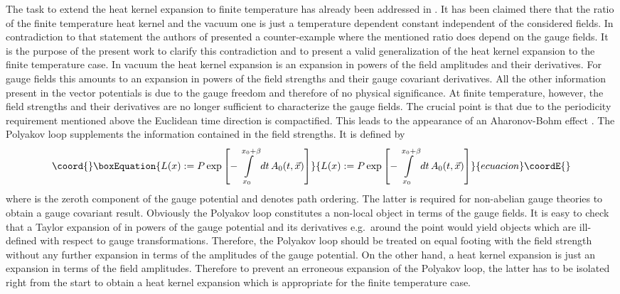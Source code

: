 \documentclass[a4paper,showpacs,showkeys,prd,nofootinbib]{revtex4}
\begin{document}
The task to extend the heat kernel expansion to finite temperature has
already been addressed in \cite{Boschi-Filho:1992ah}. It has been claimed there that the ratio
of the finite temperature heat kernel and the vacuum one is just a temperature
dependent constant independent of the considered fields. In contradiction to that
statement the authors of \cite{Actor:1998cn} presented a counter-example where the mentioned
ratio does depend on the gauge fields.
It is the purpose of the present work to clarify this contradiction and to present
a valid generalization of the heat kernel expansion to the finite temperature case.
In vacuum the heat kernel expansion is an expansion in powers of the field
amplitudes and their derivatives. For gauge fields this amounts to an expansion
in powers of the field strengths and their gauge covariant derivatives. All the
other information present in the vector potentials is due to the gauge freedom and
therefore of no physical significance. 
At finite temperature, however, the field strengths and their derivatives are no longer 
sufficient to characterize the gauge fields. The crucial point is that due to the
periodicity requirement mentioned above the Euclidean time direction is compactified.
This leads to the appearance of an Aharonov-Bohm effect \cite{Aharonov:1959fk}. 
The Polyakov loop 
\cite{Polyakov:1978vu} supplements the information contained in the field strengths. 
It is defined by
\begin{equation}\coord{}\boxEquation{
  \label{eq:defpoly}
L(x) := P \exp 
\left[-\int\limits_{x_0}^{x_0+\beta} dt \, A_0(t,\vec x) \right] 
}{
  L(x) := P \exp 
\left[-\int\limits_{x_0}^{x_0+\beta} dt \, A_0(t,\vec x) \right] 
}{ecuacion}\coordE{}\end{equation}
where \coordHE{} is the zeroth component of the gauge potential and \coordHE{} denotes path 
ordering. The latter is required for non-abelian gauge theories
to obtain a gauge covariant result. Obviously the Polyakov loop constitutes a
non-local object in terms of the gauge fields. It is easy to check that a
Taylor expansion of \coordHE{} in powers of the gauge potential and its derivatives e.g.~around
the point \coordHE{} would yield objects which are ill-defined with respect to gauge
transformations. Therefore, the Polyakov loop should be treated on equal footing
with the field strength without any further expansion in terms of the amplitudes of
the gauge potential. On the other hand, a heat kernel expansion is just an expansion
in terms of the field amplitudes. Therefore to prevent an erroneous expansion of 
the Polyakov loop, the latter has to be isolated right from the start to obtain
a heat kernel expansion which is appropriate for the finite temperature case.
\end{document}
